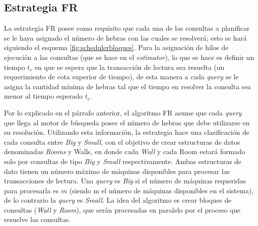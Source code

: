 \subsection{Estrategia FR}
\label{scheduling:fr}
La estrategia FR posee como requisito que cada una de las consultas a planificar se le haya asignado el número de hebras con las cuales se resolverá; esto se hará siguiendo el esquema \ref{fig:schedulerbloques}. Para la asignación de hilos de ejecución a las consultas (que se hace en el \textit{estimator}), lo que se hace es definir un tiempo $t_e$ en que se espera que la transacción de lectura sea resuelta (un requerimiento de cota superior de tiempo), de esta manera a cada \textit{query} se le asigna la cantidad mínima de hebras tal que el tiempo en resolver la consulta sea menor al tiempo esperado $t_e$.

Por lo explicado en el párrafo anterior, el algoritmo FR asume que cada \textit{query} que llega al motor de búsqueda posee el número de hebras que debe utilizarse en su resolución. Utilizando esta información, la estrategia hace una clasificación de cada consulta entre \textit{Big} y \textit{Small}, con el objetivo de crear estructuras de datos denominadas \textit{Rooms} y {Walls}, en donde cada \textit{Wall} y cada {Room} estará formado solo por consultas de tipo \textit{Big} y \textit{Small} respectivamente. Ambas estructuras de dato tienen un número máximo de máquinas disponibles para procesar las transacciones de lectura. Una \textit{query} es \textit{Big} si el número de máquinas requeridas para procesarla es $m$ (siendo m el número de máquinas disponibles en el sistema), de lo contrario la \textit{query} es \textit{Small}. La idea del algoritmo es crear bloques de consultas (\textit{Wall} y \textit{Room}), que serán procesadas en paralelo por el proceso que resuelve las consultas. 


